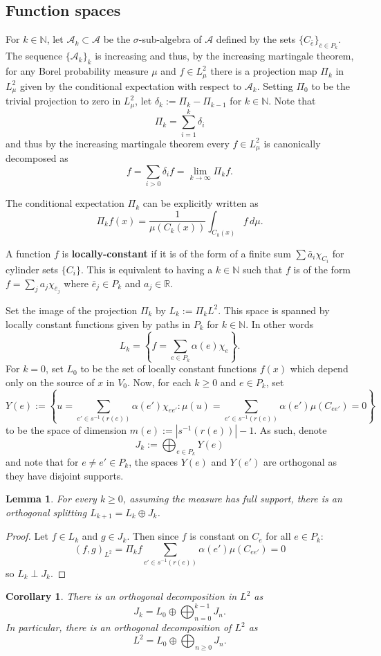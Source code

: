\documentclass[12pt]{amsart}
\theoremstyle{plain}
\newtheorem{corollary}{Corollary}[section]
\newtheorem{lemma}{Lemma}[section]
\theoremstyle{definition}
\begin{document}
\subsection{Function spaces}
\label{subsec:spaces}
For $k\in\mathbb{N}$, let $\mathcal{A}_k\subset \mathcal{A}$ be the $\sigma$-sub-algebra of $\mathcal{A}$ defined by the sets $\{C_{\bar{e}}\}_{\bar{e}\in P_k}$. The sequence $\{\mathcal{A}_k\}_k$ is increasing and thus, by the increasing martingale theorem, for any Borel probability measure $\mu$ and $f\in L^2_\mu$ there is a projection map $\Pi_k$ in $L^2_\mu$ given by the conditional expectation with respect to $\mathcal{A}_k$. Setting $\Pi_{0}  $ to be the trivial projection to zero in $L^2_\mu$, let $\delta_k:= \Pi_k- \Pi _{k-1}$ for $k\in \mathbb{N}$. Note that 
$$\Pi_k  = \sum_{i=1}^k \delta _i$$ 
and thus by the increasing martingale theorem every $f\in L^2_\mu$ is canonically decomposed as
\begin{equation}
    \label{eqn:decomp}
    f = \sum_{i>0} \delta_i f = \lim_{k\rightarrow \infty} \Pi _k f.
\end{equation}

The conditional expectation $\Pi _k$ can be explicitly written as
$$\Pi _k f (x) = \frac{1}{\mu(C_k(x))}\int_{C_k(x)} f \, d\mu .$$

A function $f$ is \textbf{locally-constant} if it is of the form of a finite sum $\sum \bar{a}_i \chi_{C_i}$ for cylinder sets $\{C_i\}$. This is equivalent to having a $k\in\mathbb{N}$ such that $f$ is of the form $f = \sum_j a_j  \chi_{\bar{e}_{j}}$ where $\bar{e}_{j}\in P_k$ and $a_j\in\mathbb{R}$. 

Set the image of the projection $\Pi_k$ by $L_k := \Pi_k L^2$. This space is spanned by locally constant functions given by paths in $P_k$ for $k\in\mathbb{N}$. In other words
$$L_k = \left\{f = \sum_{e\in P_k} \alpha(e)\chi_e\right\}.$$
For $k=0$, set $L_0$ to be the set of locally constant functions $f(x)$ which depend only on the source of $x$ in $V_0$. Now, for each $k\geq 0$ and $e\in P_k$, set
$$Y(e):= \left\{ u = \sum_{e'\in s^{-1}(r(e))}\alpha(e')\chi_{ee'}: \mu(u) = \sum_{e'\in s^{-1}(r(e))}\alpha(e')\mu(C_{ee'}) =  0  \right\}$$
to be the space of dimension $m(e) := |s^{-1}(r(e))| -1$. As such, denote
$$J_k := \bigoplus_{e\in P_k} Y(e)$$
and note that for $e\neq e'\in P_k$, the spaces $Y(e)$ and $Y(e')$ are orthogonal as they have disjoint supports.
\begin{lemma}
    For every $k\geq 0$, assuming the measure has full support, there is an orthogonal splitting $L_{k+1} = L_k\oplus J_k$. 
\end{lemma}
\begin{proof}
    Let $f\in L_k$ and $g\in J_k$. Then since $f$ is constant on $C_e$ for all $e\in P_k$:
    $$(f,g)_{L^2} = \Pi_kf \sum_{e'\in s^{-1}(r(e))}\alpha(e')\mu(C_{ee'}) = 0$$
    so $L_k\perp J_k$.
\end{proof}
\begin{corollary}
    There is an orthogonal decomposition in $L^2$ as
    $$J_k = L_0 \oplus \bigoplus_{n=0}^{k-1} J_n.$$
    In particular, there is an orthogonal decomposition of $L^2$ as
    $$L^2 = L_0 \oplus \bigoplus_{n\geq0} J_n.$$
\end{corollary}
\end{document}
